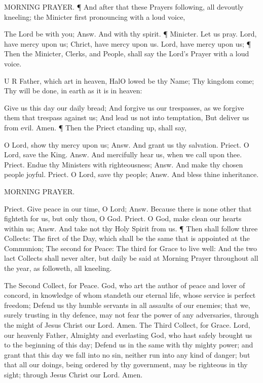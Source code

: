 MORNING PRAYER. ¶ And after that these Prayers following, all devoutly kneeling; the Minicter first pronouncing with a loud voice,

The Lord be with you; Answ. And with thy spirit. ¶ Minicter. Let us pray. Lord, have mercy upon us; Chrict, have mercy upon us. Lord, have mercy upon us; ¶ Then the Minicter, Clerks, and People, shall say the Lord’s Prayer with a loud voice.

U R Father, which art in heaven, HalO lowed be thy Name; Thy kingdom come; Thy will be done, in earth as it is in heaven:

Give us this day our daily bread; And forgive us our trespasses, as we forgive them that trespass against us; And lead us not into temptation, But deliver us from evil. Amen. ¶ Then the Priect ctanding up, shall say,

O Lord, show thy mercy upon us; Answ. And grant us thy salvation. Priect. O Lord, save the King. Answ. And mercifully hear us, when we call upon thee. Priect. Endue thy Ministers with righteousness; Answ. And make thy chosen people joyful. Priect. O Lord, save thy people; Answ. And bless thine inheritance.

MORNING PRAYER.

Priect. Give peace in our time, O Lord; Answ. Because there is none other that fighteth for us, but only thou, O God. Priect. O God, make clean our hearts within us; Answ. And take not thy Holy Spirit from us. ¶ Then shall follow three Collects: The firct of the Day, which shall be the same that is appointed at the Communion; The second for Peace: The third for Grace to live well: And the two lact Collects shall never alter, but daily be said at Morning Prayer throughout all the year, as followeth, all kneeling.

The Second Collect, for Peace. God, who art the author of peace and lover of concord, in knowledge of whom standeth our eternal life, whose service is perfect freedom; Defend us thy humble servants in all assaults of our enemies; that we, surely trusting in thy defence, may not fear the power of any adversaries, through the might of Jesus Christ our Lord. Amen. The Third Collect, for Grace. Lord, our heavenly Father, Almighty and everlasting God, who hast safely brought us to the beginning of this day; Defend us in the same with thy mighty power; and grant that this day we fall into no sin, neither run into any kind of danger; but that all our doings, being ordered by thy government, may be righteous in thy sight; through Jesus Christ our Lord. Amen.

